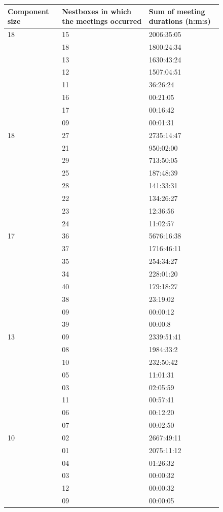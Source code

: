 \begin{figure}[p]
\begin{center}
\begin{tabular}{lll}
\hline
\textbf{Component size} &	\textbf{Nestboxes in which the meetings occurred}	&	\textbf{Sum of meeting durations (h:m:s)} \\\hline
18	& 15	& 2006:35:05 \\
 	& 18	& 1800:24:34 \\
	& 13	& 1630:43:24 \\
	& 12	& 1507:04:51 \\
	& 11	& 36:26:24 \\
	& 16	& 00:21:05 \\
	& 17	& 00:16:42 \\
	& 09	& 00:01:31 \\\hline

18	& 27	& 2735:14:47 \\
	& 21	& 950:02:00 \\
	& 29	& 713:50:05 \\
	& 25	& 187:48:39 \\
	& 28	& 141:33:31 \\
	& 22	& 134:26:27 \\
	& 23 	& 12:36:56 \\
	& 24	& 11:02:57 \\\hline

17	& 36	& 5676:16:38 \\
	& 37	& 1716:46:11 \\
	& 35	& 254:34:27 \\
	& 34	& 228:01:20 \\
	& 40	& 179:18:27 \\
	& 38	& 23:19:02 \\
	& 09	& 00:00:12 \\
	& 39	& 00:00:8 \\\hline

13	& 09	& 2339:51:41 \\
	& 08 	& 1984:33:2 \\
	& 10	& 232:50:42 \\
	& 05	& 11:01:31 \\
	& 03 	& 02:05:59 \\
	& 11 	& 00:57:41 \\
	& 06	& 00:12:20 \\
	& 07	& 00:02:50 \\\hline
	
10	& 02	& 2667:49:11 \\
	& 01	& 2075:11:12 \\
	& 04	& 01:26:32 \\
	& 03	& 00:00:32 \\
	& 12	& 00:00:32 \\
	& 09	& 00:00:05 \\\hline


\end{tabular}
\end{center}
\end{figure}
